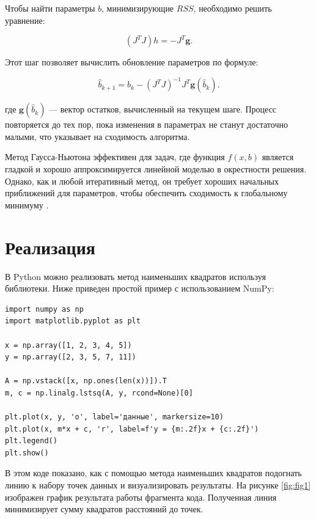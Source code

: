 \documentclass[11pt,a4paper]{article}
\begin{document}
Чтобы найти параметры $b$, минимизирующие $RSS$, необходимо решить уравнение:

\begin{equation}
(J^T J) h = -J^T \mathbf{g}.
\end{equation}

Этот шаг позволяет вычислить обновление параметров по формуле:

\begin{equation}
\hat b_{k+1} = \hat b_k - (J^T J)^{-1} J^T \mathbf{g}(\hat b_k).
\end{equation}

где $\mathbf{g}(\hat b_k)$ — вектор остатков, вычисленный на текущем шаге. Процесс повторяется до тех пор, пока изменения в параметрах не станут достаточно малыми, что указывает на сходимость алгоритма.

Метод Гаусса-Ньютона эффективен для задач, где функция $f(x, b)$ является гладкой и хорошо аппроксимируется линейной моделью в окрестности решения. Однако, как и любой итеративный метод, он требует хороших начальных приближений для параметров, чтобы обеспечить сходимость к глобальному минимуму \cite{madsen}.


\section{Реализация}

В Python можно реализовать метод наименьших квадратов используя библиотеки. Ниже приведен простой пример с использованием NumPy:

\begin{verbatim}
import numpy as np
import matplotlib.pyplot as plt

x = np.array([1, 2, 3, 4, 5])
y = np.array([2, 3, 5, 7, 11])

A = np.vstack([x, np.ones(len(x))]).T
m, c = np.linalg.lstsq(A, y, rcond=None)[0]

plt.plot(x, y, 'o', label='данные', markersize=10)
plt.plot(x, m*x + c, 'r', label=f'y = {m:.2f}x + {c:.2f}')
plt.legend()
plt.show()
\end{verbatim}

В этом коде показано, как с помощью метода наименьших квадратов подогнать линию к набору точек данных и визуализировать результаты. На рисунке \ref{fig:fig1} изображен график результата работы фрагмента кода. Полученная линия минимизирует сумму квадратов расстояний до точек.
\end{document}
